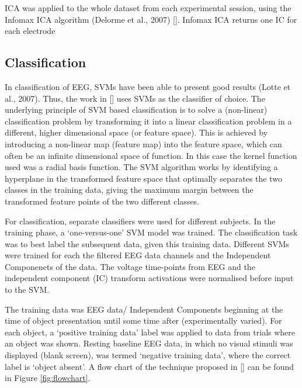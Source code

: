 \documentclass{article} %
\begin{document}
ICA was applied to the whole dataset from each experimental session, using the Infomax ICA algorithm (Delorme et al., 2007) []. Infomax ICA returns one IC for each electrode

\subsection{Classification}
In classification of EEG, SVMs have been able to present good results (Lotte et al., 2007). Thus, the work in [] uses SVMs as the classifier of choice. The underlying principle of SVM based classification is to solve
a (non-linear) classification problem by transforming it into a linear classification problem in a different, higher dimensional space (or feature space). This is achieved by introducing a non-linear map (feature map)
into the feature space, which can often be an infinite dimensional space of function. In this case the kernel function used  was a radial basis function. The SVM algorithm works by identifying a hyperplane in the transformed feature space that optimally separates the two classes in the training data, giving the maximum margin between the transformed feature points of the two different classes.

For classification, separate classifiers were used for different subjects. In the training phase, a ‘one-versus-one’ SVM model was trained. The classification task was to best label the subsequent data, given this training data. Different SVMs were trained for each the filtered EEG data channels and the Independent Componenets of the data. The voltage time-points from EEG and the independent component (IC) transform activations were normalised before input to the SVM. 

The training data was EEG data/ Independent Components beginning at the time of object presentation until some time after (experimentally varied). For each object, a ‘positive training data’ label was applied to data from trials where an object was shown. Resting baseline EEG data, in which no visual stimuli was displayed (blank screen), was termed ‘negative training data’, where the correct label is ‘object absent’. A flow chart of the technique proposed in [] can be found in Figure \ref{fig:flowchart}.
\end{document}
